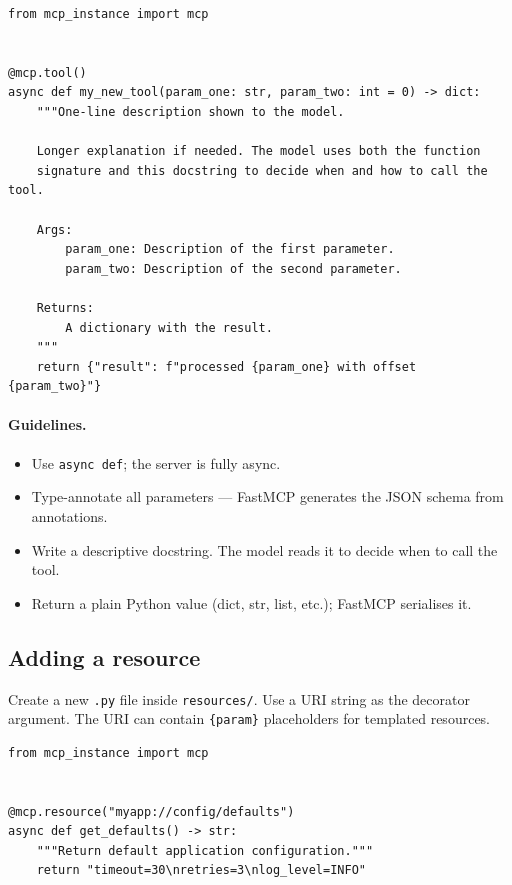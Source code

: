 \documentclass[11pt, a4paper]{article}
\begin{document}
\begin{lstlisting}[caption={tools/my\_new\_tool.py}]
from mcp_instance import mcp


@mcp.tool()
async def my_new_tool(param_one: str, param_two: int = 0) -> dict:
    """One-line description shown to the model.

    Longer explanation if needed. The model uses both the function
    signature and this docstring to decide when and how to call the tool.

    Args:
        param_one: Description of the first parameter.
        param_two: Description of the second parameter.

    Returns:
        A dictionary with the result.
    """
    return {"result": f"processed {param_one} with offset {param_two}"}
\end{lstlisting}

\paragraph{Guidelines.}
\begin{itemize}
  \item Use \texttt{async def}; the server is fully async.
  \item Type-annotate all parameters — FastMCP generates the JSON schema from annotations.
  \item Write a descriptive docstring. The model reads it to decide when to call the tool.
  \item Return a plain Python value (dict, str, list, etc.); FastMCP serialises it.
\end{itemize}

\subsection{Adding a resource}

Create a new \texttt{.py} file inside \texttt{resources/}. Use a URI string as the decorator argument. The URI can contain \texttt{\{param\}} placeholders for templated resources.

\begin{lstlisting}[caption={resources/my\_static\_resource.py — fixed URI}]
from mcp_instance import mcp


@mcp.resource("myapp://config/defaults")
async def get_defaults() -> str:
    """Return default application configuration."""
    return "timeout=30\nretries=3\nlog_level=INFO"
\end{lstlisting}
\end{document}
